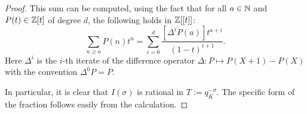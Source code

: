 \begin{proof}
This sum can be computed, using the fact that for all $a \in {{\mathbb N}}$ and $P(t) \in {{\mathbb Z}}[t]$ of degree $d$, the following holds in ${{\mathbb Z}}[[t]]$:
\[\sum_{n \geqslant a} P(n)t^n =\sum_{i=0}^d	\frac{[\Delta^iP(a)]t^{a+i}}{(1 - t )^{i+1}}.\]
Here $\Delta^i$ is the $i$-th iterate of the difference operator $\Delta:P \mapsto P(X + 1) - P(X)$ with the convention $\Delta^0P = P$.

 
In particular, it is clear that $I(\sigma)$ is rational in $T:=q_K^{-\sigma}$. The specific form of the fraction follows easily from the calculation.

\end{proof}